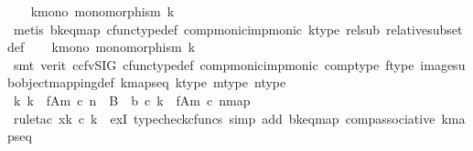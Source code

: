 \begin{isabellebody}
\ \ \isamarkupfalse%
\ k{\isacharunderscore}{\kern0pt}mono{\isacharcolon}{\kern0pt}\ {\isachardoublequoteopen}monomorphism\ k{\isachardoublequoteclose}\isanewline
\ \ \ \ \isamarkupfalse%
\ {\isacharparenleft}{\kern0pt}metis\ b{\isacharunderscore}{\kern0pt}k{\isacharunderscore}{\kern0pt}eq{\isacharunderscore}{\kern0pt}map\ cfunc{\isacharunderscore}{\kern0pt}type{\isacharunderscore}{\kern0pt}def\ comp{\isacharunderscore}{\kern0pt}monic{\isacharunderscore}{\kern0pt}imp{\isacharunderscore}{\kern0pt}monic\ k{\isacharunderscore}{\kern0pt}type\ rel{\isacharunderscore}{\kern0pt}sub{}\ relative{\isacharunderscore}{\kern0pt}subset{\isacharunderscore}{\kern0pt}def{}{\isacharparenright}{\kern0pt}\isanewline
\ \ \isamarkupfalse%
\ k{\isacharprime}{\kern0pt}{\isacharunderscore}{\kern0pt}mono{\isacharcolon}{\kern0pt}\ {\isachardoublequoteopen}monomorphism\ k{\isacharprime}{\kern0pt}{\isachardoublequoteclose}\isanewline
\ \ \ \ \isamarkupfalse%
\ {\isacharparenleft}{\kern0pt}smt\ {\isacharparenleft}{\kern0pt}verit{\isacharcomma}{\kern0pt}\ ccfv{\isacharunderscore}{\kern0pt}SIG{\isacharparenright}{\kern0pt}\ cfunc{\isacharunderscore}{\kern0pt}type{\isacharunderscore}{\kern0pt}def\ comp{\isacharunderscore}{\kern0pt}monic{\isacharunderscore}{\kern0pt}imp{\isacharunderscore}{\kern0pt}monic\ comp{\isacharunderscore}{\kern0pt}type\ f{\isacharunderscore}{\kern0pt}type\ image{\isacharunderscore}{\kern0pt}subobject{\isacharunderscore}{\kern0pt}mapping{\isacharunderscore}{\kern0pt}def{}\ k{\isacharprime}{\kern0pt}{\isacharunderscore}{\kern0pt}maps{\isacharunderscore}{\kern0pt}eq\ k{\isacharprime}{\kern0pt}{\isacharunderscore}{\kern0pt}type\ m{\isacharunderscore}{\kern0pt}type\ n{\isacharunderscore}{\kern0pt}type{\isacharparenright}{\kern0pt}\isanewline
\isanewline
\ \ \isamarkupfalse%
\ {\isachardoublequoteopen}{\isasymexists}k{\isachardot}{\kern0pt}\ k\ {\isacharcolon}{\kern0pt}\ f{\isasymlparr}A{\isasymrparr}\isactrlbsub m\ {\isasymcirc}\isactrlsub c\ n\isactrlesub \ {\isasymrightarrow}\ B\ {\isasymand}\ b\ {\isasymcirc}\isactrlsub c\ k\ {\isacharequal}{\kern0pt}\ {\isacharbrackleft}{\kern0pt}f{\isasymlparr}A{\isasymrparr}\isactrlbsub m\ {\isasymcirc}\isactrlsub c\ n\isactrlesub {\isacharbrackright}{\kern0pt}map{\isachardoublequoteclose}\isanewline
\ \ \ \ \isamarkupfalse%
\ {\isacharparenleft}{\kern0pt}rule{\isacharunderscore}{\kern0pt}tac\ x{\isacharequal}{\kern0pt}{\isachardoublequoteopen}k\ {\isasymcirc}\isactrlsub c\ k{\isacharprime}{\kern0pt}{\isachardoublequoteclose}\ \ exI{\isacharcomma}{\kern0pt}\ typecheck{\isacharunderscore}{\kern0pt}cfuncs{\isacharcomma}{\kern0pt}\ simp\ add{\isacharcolon}{\kern0pt}\ b{\isacharunderscore}{\kern0pt}k{\isacharunderscore}{\kern0pt}eq{\isacharunderscore}{\kern0pt}map\ comp{\isacharunderscore}{\kern0pt}associative{}\ k{\isacharprime}{\kern0pt}{\isacharunderscore}{\kern0pt}maps{\isacharunderscore}{\kern0pt}eq{\isacharparenright}{\kern0pt}\isanewline

\end{isabellebody}
